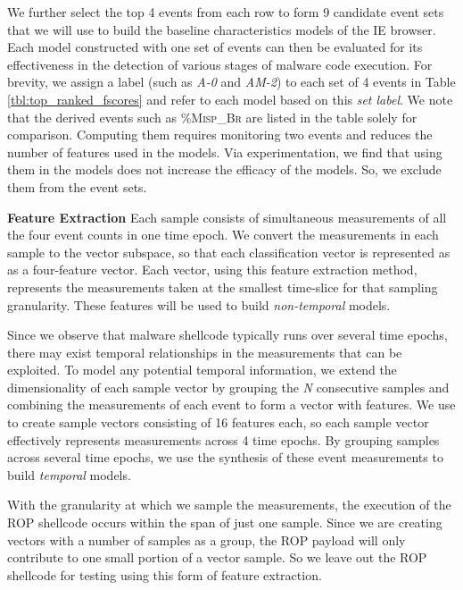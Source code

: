 \documentclass{acm_proc_article-sp}
\begin{document}
We further select the top 4 events from each row to form 9 candidate 
event sets that we will use to build 
the baseline characteristics models of the IE browser.
Each model constructed with one set of events can then be evaluated 
for its effectiveness in the detection of various stages of malware 
code execution. For brevity, we assign a label (such as \textit{A-0} 
and \textit{AM-2}) to each set of 4 events in Table 
\ref{tbl:top_ranked_fscores} and refer to each model based on this
\textit{set label}. We note that the derived events such as 
\textsc{\%Misp\_Br} are listed in the table solely for comparison. 
Computing them requires monitoring two events and reduces the number
of features used in the models. Via experimentation, we find that 
using them in the models does not increase the efficacy of the models. 
So, we exclude them from the event sets.

\textbf{Feature Extraction} \space\space Each sample consists of 
simultaneous measurements of all the four event counts in one time epoch. 
We convert the measurements in each sample to the vector subspace, so 
that each classification vector is represented as as a four-feature 
vector. Each vector, using this feature extraction method, represents 
the measurements taken at the smallest time-slice for that sampling 
granularity. These features will be used to build \textit{non-temporal} models.

Since we observe that malware shellcode typically runs over several time 
epochs, there may exist temporal relationships in the measurements 
that can be exploited. To model any potential temporal information, 
we extend the dimensionality of each sample vector by grouping the 
\textit{N} consecutive samples and combining the measurements of each 
event to form a vector with  features. We use  to create 
sample vectors consisting of 16 features each, so each sample vector 
effectively represents measurements across 4 time epochs. By grouping
samples across several time epochs, we use the synthesis of these 
event measurements to build \textit{temporal} models.

With the 
granularity at which we sample the measurements, the execution of 
the ROP shellcode occurs within the span of just one sample. Since we 
are creating vectors with a number of samples as a group, the ROP 
payload will only contribute to one small portion of a vector sample. 
So we leave out the ROP shellcode for testing using this form of 
feature extraction.
\end{document}
